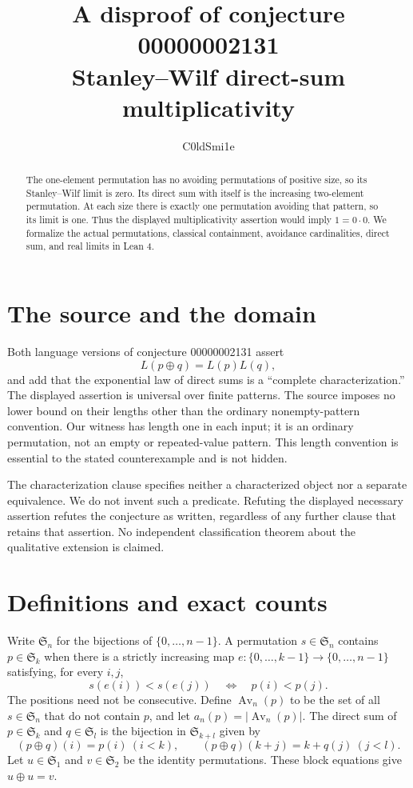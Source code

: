 \documentclass[10pt]{article}
\title{A disproof of conjecture 00000002131\\\large Stanley--Wilf direct-sum multiplicativity}
\author{C0ldSmi1e}
\date{}
\newcommand{\Av}{\operatorname{Av}}
\newcommand{\Sym}{\mathfrak S}
\begin{document}
\maketitle
\begin{abstract}
The one-element permutation has no avoiding permutations of positive size, so
its Stanley--Wilf limit is zero. Its direct sum with itself is the increasing
two-element permutation. At each size there is exactly one permutation avoiding
that pattern, so its limit is one. Thus the displayed multiplicativity assertion
would imply $1=0\cdot0$. We formalize the actual permutations, classical
containment, avoidance cardinalities, direct sum, and real limits in Lean 4.
\end{abstract}

\section{The source and the domain}
Both language versions of conjecture 00000002131 assert
\[
 L(p\oplus q)=L(p)L(q),
\]
and add that the exponential law of direct sums is a ``complete
characterization.'' The displayed assertion is universal over finite patterns.
The source imposes no lower bound on their lengths other than the ordinary
nonempty-pattern convention. Our witness has length one in each input; it is an
ordinary permutation, not an empty or repeated-value pattern. This length
convention is essential to the stated counterexample and is not hidden.

The characterization clause specifies neither a characterized object nor a
separate equivalence. We do not invent such a predicate. Refuting the displayed
necessary assertion refutes the conjecture as written, regardless of any further
clause that retains that assertion. No independent classification theorem about
the qualitative extension is claimed.

\section{Definitions and exact counts}
Write $\Sym_n$ for the bijections of $\{0,\ldots,n-1\}$. A permutation
$s\in\Sym_n$ contains $p\in\Sym_k$ when there is a strictly increasing map
$e:\{0,\ldots,k-1\}\to\{0,\ldots,n-1\}$ satisfying, for every $i,j$,
\[
 s(e(i))<s(e(j))\quad\Longleftrightarrow\quad p(i)<p(j).
\]
The positions need not be consecutive. Define $\Av_n(p)$ to be the set of all
$s\in\Sym_n$ that do not contain $p$, and let $a_n(p)=|\Av_n(p)|$.
The direct sum of $p\in\Sym_k$ and $q\in\Sym_l$ is the bijection in
$\Sym_{k+l}$ given by
\[
 (p\oplus q)(i)=p(i)\ (i<k),\qquad
 (p\oplus q)(k+j)=k+q(j)\ (j<l).
\]
Let $u\in\Sym_1$ and $v\in\Sym_2$ be the identity permutations. These block
equations give $u\oplus u=v$.
\end{document}
